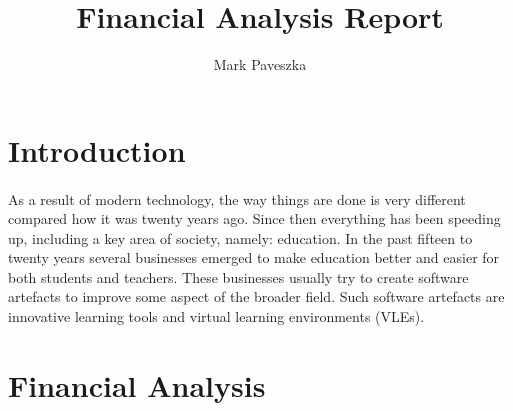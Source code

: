 \documentclass[]{article}
\title{Financial Analysis Report}
\author{Mark Paveszka}
\begin{document}
\maketitle

\newpage

\begin{abstract}
\end{abstract}

\newpage

\tableofcontents

\newpage

\section{Introduction}
\paragraph{}
As a result of modern technology, the way things are done is very different compared how it was twenty years ago. Since then everything has been speeding up, including a key area of society, namely: education. In the past fifteen to twenty years several businesses emerged to make education better and easier for both students and teachers. These businesses usually try to create software artefacts to improve some aspect of the broader field. Such software artefacts are innovative learning tools and virtual learning environments (VLEs).

\section{Financial Analysis}

\newpage


\end{document}
